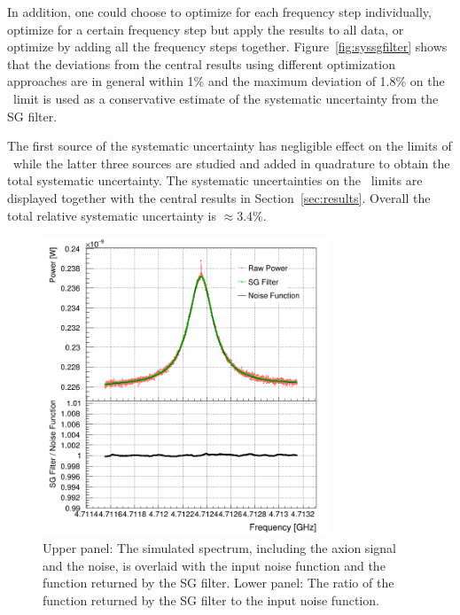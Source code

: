 \begin{itemize}
In addition, one could choose to optimize for each frequency step 
individually, optimize for a certain frequency step but apply the results to 
all data, or optimize by adding all the frequency steps together. 
Figure~\ref{fig:syssgfilter} shows that 
the deviations from the central results using different optimization 
approaches are in general within 1\% and the 
maximum deviation of 1.8\% 
on the \gagg\ limit is used as a conservative estimate of the systematic 
uncertainty from the SG filter. 

\end{itemize}

The first source of the systematic uncertainty 
has negligible effect on the limits of \gagg\ while the 
latter three sources are studied and added in quadrature to obtain the total 
systematic uncertainty. The systematic uncertainties on the \gagg\ limits 
are displayed together with the central results in Section~\ref{sec:results}. 
Overall the total relative systematic uncertainty is $\approx 3.4\%$.

\begin{figure} [htbp]
  \centering
  \includegraphics[width=8.6cm]{figures/GeneratedSpectrum_Optimized_SGFilter_NPar_3_Window_141.png}
  \caption{Upper panel: 
 The simulated spectrum, including the axion signal and the noise, 
 is overlaid with the input noise function and the function returned by 
 the SG filter. Lower panel: The ratio of the function returned by the SG 
 filter to the input noise function.}
  \label{fig:sgcompare}
\end{figure}


